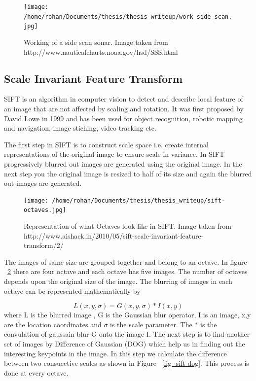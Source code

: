 \documentclass[12pt,draft]{dalcsthesis}
\begin{document}
\begin{figure}
  \centering
     {\texttt{[image: /home/rohan/Documents/thesis/thesis\_writeup/work\_side\_scan.jpg]}}
  \caption{\label{fig- side scan sonar working} Working of a side scan sonar. Image taken from \cite{}{http://www.nauticalcharts.noaa.gov/hsd/SSS.html} }
\end{figure}

\subsection{Scale Invariant Feature Transform}
SIFT is an algorithm in computer vision to detect and describe local feature of an image that are not affected by scaling and rotation. It was first proposed by David Lowe in 1999 \cite{lowe1999object} and has been used for object recognition, robotic mapping and navigation, image stiching, video tracking etc.

The first step in SIFT is to construct scale space i.e. create internal representations of the original image to ensure scale in variance. In SIFT progressively blurred out images are generated using the original image. In the next step you the original image is resized to half of its size and again the blurred out images are generated. 

\begin{figure}
  \centering
     {\texttt{[image: /home/rohan/Documents/thesis/thesis\_writeup/sift-octaves.jpg]}}
  \caption{\label{fig- sift octaves} Representation of what Octaves look like in SIFT. Image taken from \cite{}{http://www.aishack.in/2010/05/sift-scale-invariant-feature-transform/2/} }
\end{figure}

The images of same size are grouped together and belong to an octave. In figure ~\ref{fig- sift octaves} there are four octave and each octave has five images. The number of octaves depends upon the original size of the image. The blurring of images in each octave can be represented mathematically by 

\begin{equation}
L(x,y,\sigma) = G(x,y,\sigma) * I(x,y)
\end{equation}
where L is the blurred image , G is the Gaussian blur operator, I is an image, x,y are the location coordinates and $\sigma$ is the scale parameter. The $*$ is the convulation of gaussain blur G onto the image I. 
The next step is to find another set of images by Difference of Gaussian (DOG) which help us in finding out the interesting keypoints in the image. In this step we calculate the difference between two consuective scales as shown in Figure ~\ref{fig- sift dog}. This process is done at every octave. 
\end{document}

